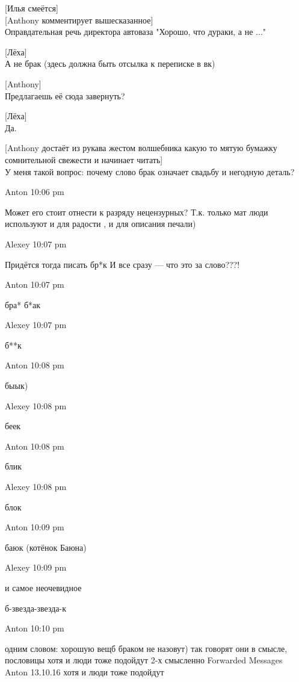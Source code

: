 [Илья смеётся]\\


[Anthony комментирует вышесказанное]\\
Оправдательная речь директора автоваза
"Хорошо, что дураки, а не ..."


[Лёха]\\
А не брак (здесь должна быть отсылка к переписке в вк) %


[Anthony]\\
Предлагаешь её сюда завернуть?


[Лёха]\\
Да.


[Anthony достаёт из рукава жестом волшебника какую то мятую бумажку сомнительной свежести и начинает читать]\\
У меня такой вопрос: почему слово брак означает свадьбу и негодную деталь?

Anton 10:06 pm %

    Может его стоит отнести к разряду нецензурных? Т.к. только мат люди используют и для радости , и для описания печали)

Alexey 10:07 pm

    Придётся тогда писать бр*к
    И все сразу — что это за слово???!

Anton 10:07 pm

    бра*
    б*ак

Alexey 10:07 pm

    б**к

Anton 10:08 pm

    быык)

Alexey 10:08 pm

    беек

Anton 10:08 pm

    блик

Alexey 10:08 pm

    блок

Anton 10:09 pm

    баюк
    (котёнок Баюна)

Alexey 10:09 pm

    и самое неочевидное

    б-звезда-звезда-к

Anton 10:10 pm

    одним словом: хорошую вещб браком не назовут)
    так говорят они
    в смысле, пословицы
    хотя и люди тоже подойдут
    2-х смысленно
    Forwarded Messages
    Anton 13.10.16
        хотя и люди тоже подойдут

